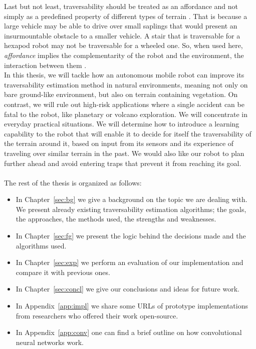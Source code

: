 \documentclass[12pt,a4paper]{report}
\newcommand{\term}{\textit}
\newcommand{\acronym}{\MakeUppercase}
\begin{document}
	Last but not least, traversability should be treated as an affordance and 
	not simply as a predefined property of different types of terrain \citep{Kim}. 
	That is because a large vehicle may be able to drive over small saplings that 
	would present an insurmountable obstacle to a smaller vehicle. A stair that is 
	traversable for a hexapod robot may not be traversable for a wheeled one. So, 
	when used here, \term{affordance} implies the complementarity of the robot and 
	the environment, the interaction between them \citep{Ugur}.
	\\
	
	In this thesis, we will tackle how an autonomous mobile robot can improve its 
	traversability estimation method in natural environments, meaning not 
	only on bare ground-like environment, but also on terrain containing vegetation. 
	On contrast, we will rule out high-risk applications where a single accident can 
	be fatal to the robot, like planetary or volcano exploration. We will concentrate 
	in everyday practical situations. We will determine how to introduce a learning 
	capability to the robot that will enable it to decide for itself the 
	traversability of the terrain around it, based on input from its sensors 
	and its experience of traveling over similar terrain in the past. We would also 
	like our robot to plan further ahead and avoid entering traps that prevent it 
	from reaching its goal.
	\\\\
	
	The rest of the thesis is organized as follows:
	\begin{itemize}
		\item In Chapter~\ref{sec:bg} we give a background on the topic we are dealing 
		with. We present already existing traversability estimation algorithms; the 
		goals, the approaches, the methods used, the strengths and weaknesses. 
		\item In Chapter~\ref{sec:fg} we present the logic behind the decisions made 
		and the algorithms used.
		\item In Chapter~\ref{sec:exp} we perform an evaluation of our implementation 
		and compare it with previous ones.
		\item In Chapter~\ref{sec:concl} we give our conclusions and ideas for future 
		work.
		\item In Appendix~\ref{app:impl} we share some \acronym{url}s of prototype 
		implementations from researchers who offered their work open-source.
		\item In Appendix~\ref{app:conv} one can find a brief outline on how 
		convolutional neural networks work.
	\end{itemize}
	
\end{document}
